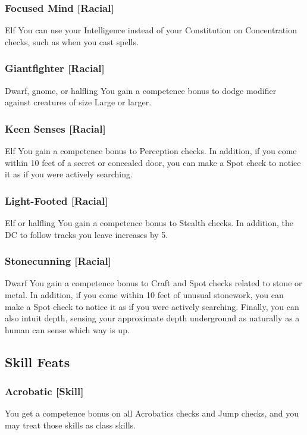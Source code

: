 \subsubsection{Focused Mind [Racial]}
 Elf
 You can use your Intelligence instead of your Constitution on Concentration checks, such as when you cast spells.

\subsubsection{Giantfighter [Racial]}
 Dwarf, gnome, or halfling
 You gain a  competence bonus to dodge modifier against creatures of size Large or larger.

\subsubsection{Keen Senses [Racial]}
 Elf
 You gain a  competence bonus to Perception checks. In addition, if you come within 10 feet of a secret or concealed door, you can make a Spot check to notice it as if you were actively searching.

\subsubsection{Light-Footed [Racial]}
 Elf or halfling
 You gain a  competence bonus to Stealth checks. In addition, the DC to follow tracks you leave increases by 5.

\subsubsection{Stonecunning [Racial]}
 Dwarf
 You gain a  competence bonus to Craft and Spot checks related to stone or metal. In addition, if you come within 10 feet of unusual stonework, you can make a Spot check to notice it as if you were actively searching. Finally, you can also intuit depth, sensing your approximate depth underground as naturally as a human can sense which way is up.

\subsection{Skill Feats}

\subsubsection{Acrobatic [Skill]}
 You get a  competence bonus on all Acrobatics checks and Jump checks, and you may treat those skills as class skills.

